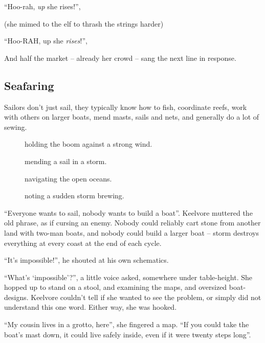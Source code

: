 \begin{multicols}{2}
\begin{exampletext}
  ``Hoo-rah, \emph{up} she rises!'',

  (she mimed to the elf to thrash the strings harder)

  ``Hoo-RAH, up she \emph{rises}!'',

  And half the market -- already her crowd -- sang the next line in response.

\end{exampletext}

\subsection{Seafaring}

Sailors don't just sail, they typically know how to fish, coordinate reefs, work with others on larger boats, mend masts, sails and nets, and generally do a lot of sewing.

\begin{description}
  \item[]
    holding the boom against a strong wind.
  \item[]
    mending a sail in a storm.
  \item[]
    navigating the open oceans.
  \item[]
    noting a sudden storm brewing.
\end{description}

\begin{exampletext}
  ``Everyone wants to sail, nobody wants to build a boat''.
  Keelvore muttered the old phrase, as if cursing an enemy.
  Nobody could reliably cart stone from another land with two-man boats, and nobody could build a larger boat -- \gls{storm} destroys everything at every coast at the end of each \gls{cycle}.

  ``It's impossible!'', he shouted at his own schematics.

  ``What's `impossible'?'', a little voice asked, somewhere under table-height.
  She hopped up to stand on a stool, and examining the maps, and oversized boat-designs.
  Keelvore couldn't tell if she wanted to see the problem, or simply did not understand this one word.
  Either way, she was hooked.

  ``My cousin lives in a grotto, here'', she fingered a map.
  ``If you could take the boat's mast down, it could live safely inside, even if it were twenty \glspl{step} long''.


\end{exampletext}
\end{multicols}
